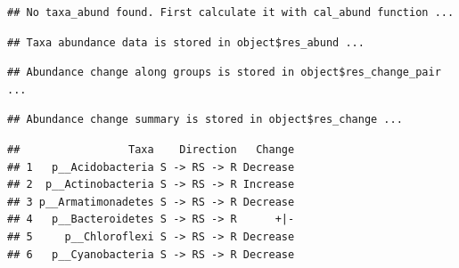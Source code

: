 \documentclass[
]{book}
\newenvironment{Shaded}{\begin{snugshade}}{\end{snugshade}}
\newcommand{\AttributeTok}[1]{\textcolor[rgb]{0.77,0.63,0.00}{#1}}
\newcommand{\CommentTok}[1]{\textcolor[rgb]{0.56,0.35,0.01}{\textit{#1}}}
\newcommand{\ConstantTok}[1]{\textcolor[rgb]{0.00,0.00,0.00}{#1}}
\newcommand{\FloatTok}[1]{\textcolor[rgb]{0.00,0.00,0.81}{#1}}
\newcommand{\FunctionTok}[1]{\textcolor[rgb]{0.00,0.00,0.00}{#1}}
\newcommand{\NormalTok}[1]{#1}
\newcommand{\OtherTok}[1]{\textcolor[rgb]{0.56,0.35,0.01}{#1}}
\newcommand{\SpecialCharTok}[1]{\textcolor[rgb]{0.00,0.00,0.00}{#1}}
\newcommand{\StringTok}[1]{\textcolor[rgb]{0.31,0.60,0.02}{#1}}
\begin{document}
\begin{Shaded}
\end{Shaded}

\begin{verbatim}
## No taxa_abund found. First calculate it with cal_abund function ...
\end{verbatim}

\begin{verbatim}
## Taxa abundance data is stored in object$res_abund ...
\end{verbatim}

\begin{verbatim}
## Abundance change along groups is stored in object$res_change_pair ...
\end{verbatim}

\begin{verbatim}
## Abundance change summary is stored in object$res_change ...
\end{verbatim}

\begin{Shaded}
\end{Shaded}

\begin{verbatim}
##                 Taxa    Direction   Change
## 1   p__Acidobacteria S -> RS -> R Decrease
## 2  p__Actinobacteria S -> RS -> R Increase
## 3 p__Armatimonadetes S -> RS -> R Decrease
## 4   p__Bacteroidetes S -> RS -> R      +|-
## 5     p__Chloroflexi S -> RS -> R Decrease
## 6   p__Cyanobacteria S -> RS -> R Decrease
\end{verbatim}
\end{document}
